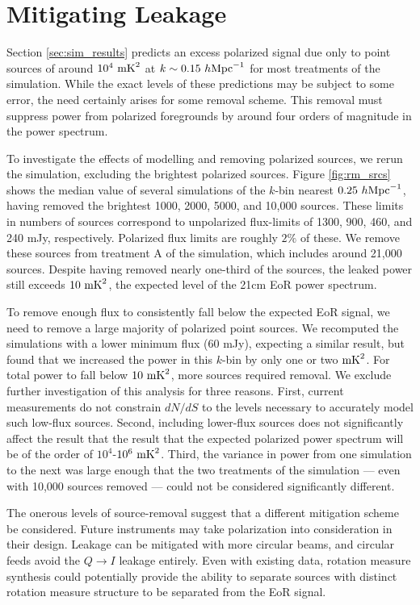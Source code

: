 \section{Mitigating Leakage}
\label{sec:sim_mitigation}

Section \ref{sec:sim_results} predicts an excess polarized signal due only to point sources of
around $10^4\ {\rm mK}^2$ at $k\sim 0.15\ h{\rm Mpc}^{-1}$ for most treatments of the simulation.
While the exact levels of these predictions may be subject to some error, the need certainly arises
for some removal scheme. This removal must suppress power from polarized foregrounds by around four
orders of magnitude in the power spectrum.

To investigate the effects of modelling and removing polarized sources, we rerun the simulation,
excluding the brightest polarized sources. Figure \ref{fig:rm_srcs} shows the median value of
several simulations of the $k$-bin nearest $0.25\ h{\rm Mpc}^{-1}$, having removed the brightest
1000, 2000, 5000, and 10,000 sources. These limits in numbers of sources correspond to unpolarized 
flux-limits of 1300, 900, 460, and 240 mJy, respectively. Polarized flux limits are roughly $2\%$ of
these. We remove these sources from treatment A of
the simulation, which includes around 21,000 sources. Despite having removed nearly one-third of
the sources, the leaked power still exceeds $10\ {\rm mK}^2$, the expected level of the 21cm EoR
power spectrum.

To remove enough flux to consistently fall below the expected EoR signal, we need to remove a large 
majority of polarized point sources. We recomputed the simulations with a lower minimum flux (60
mJy), expecting a similar result, but found that we increased the power in this $k$-bin by only one
or two ${\rm mK}^2$. For total power to fall below $10\ {\rm mK}^2$, more sources required removal.
We exclude further investigation of this analysis for three reasons. First, current measurements do
not constrain $dN/dS$ to the levels necessary to accurately model such low-flux sources. Second,
including lower-flux sources does not significantly affect the result that the result that the
expected polarized power spectrum will be of the order of $10^4$-$10^6\ {\rm mK}^2$. Third, the
variance in power from one simulation to the next was large enough that the two treatments of the
simulation --- even with 10,000 sources removed --- could not be considered significantly different.

The onerous levels of source-removal suggest that a different mitigation scheme be considered.
Future instruments may take polarization into consideration in their design. Leakage can be
mitigated with more circular beams, and circular feeds avoid the $Q\to I$ leakage entirely. Even
with existing data, rotation measure synthesis \cite{BrentjensDeBruyn} could potentially provide the
ability to separate sources with distinct rotation measure structure to be separated from the EoR
signal.
